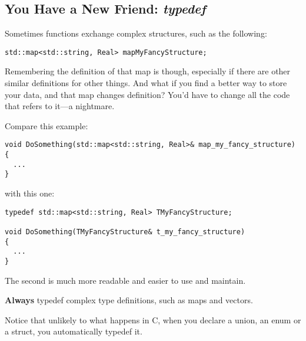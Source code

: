\documentclass[a4paper]{article}
\begin{document}
\subsection{You Have a New Friend: {\it typedef}}
\label{subsec:typedef}
Sometimes functions exchange complex structures, such as the
following:
\begin{lstlisting}
std::map<std::string, Real> mapMyFancyStructure;
\end{lstlisting}
Remembering the definition of that map is though, especially if there
are other similar definitions for other things. And what if you find a
better way to store your data, and that map changes definition? You'd
have to change all the code that refers to it---a nightmare.

Compare this example:
%
\begin{lstlisting}
void DoSomething(std::map<std::string, Real>& map_my_fancy_structure)
{
  ...
}
\end{lstlisting}
%
with this one:
%
\begin{lstlisting}
typedef std::map<std::string, Real> TMyFancyStructure;

void DoSomething(TMyFancyStructure& t_my_fancy_structure)
{
  ...
}
\end{lstlisting}
%
The second is much more readable and easier to use and maintain.
\begin{warning}
  {\bf Always} typedef complex type definitions, such as maps and
  vectors.
\end{warning}
Notice that unlikely to what happens in C, when you declare a union,
an enum or a struct, you automatically typedef it.
\end{document}
